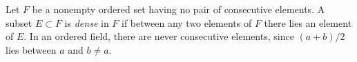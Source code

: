 Let $F$ be a nonempty ordered set having no pair of consecutive elements. A subset $E \subset F$ is \emph{dense} in $F$ if between any two elements of $F$ there lies an element of $E$. In an ordered field, there are never consecutive elements, since $(a+b)/2$ lies between $a$ and $b \neq a$.